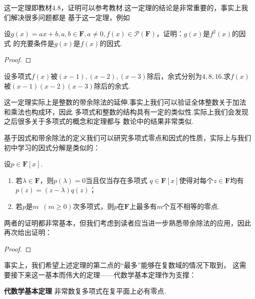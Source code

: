 这一定理即教材4.8，证明可以参考教材.这一定理的结论是非常重要的，事实上我们解决很多问题都是
基于这一定理，例如
\begin{example}
    设$g(x)=ax+b,a,b\in\mathbf{F},a\neq 0,
	f(x)\in \mathcal{P}(\mathbf{F})$，证明：$g(x)$是$f^2(x)$的因式
	的充要条件是$g(x)$是$f(x)$的因式.
\end{example}
\begin{proof}
    
\end{proof}

\begin{example}
    设多项式$f(x)$被$(x-1),(x-2),(x-3)$除后，余式分别为$4,8,16$.求$f(x)$被$(x-1)(x-2)(x-3)$除后的余式.
\end{example}
\begin{solution}

\end{solution}

这一定理实际上是整数的带余除法的延伸.事实上我们可以验证全体整数关于加法和乘法也构成环，因此
多项式和整数的结构具有一定的类似性.实际上我们会发现之后很多关于多项式的概念和定理都与
数论中的结果非常类似.

基于因式和带余除法的定义我们可以研究多项式零点和因式的性质，实际上与我们初中学习的因式分解是类似的：
\begin{theorem}
    设$p\in\mathbf{F}[x]$.
    \begin{enumerate}
        \item 若$\lambda\in\mathbf{F}$，则$p(\lambda)=0$当且仅当存在多项式
            $q\in\mathbf{F}[x]$使得对每个$z\in\mathbf{F}$均有$p(z)=(z-\lambda)q(z)$；

        \item 若$p$是$m\enspace(m \geqslant 0)$次多项式，则$p$在$\mathbf{F}$上最多有$m$个互不相等的零点.
    \end{enumerate}
\end{theorem}
两者的证明都非常基本，但我们考虑到读者应当进一步熟悉带余除法的应用，因此再次给出证明：
\begin{proof}
    
\end{proof}

事实上，我们希望上述定理的第二点的``最多''能够在复数域的情况下取到，
这需要接下来这一基本而伟大的定理——代数学基本定理作为支撑：
\begin{theorem} \textbf{\heiti 代数学基本定理} \label{thm:17:代数学基本定理}
    非常数复多项式在复平面上必有零点.
\end{theorem}

